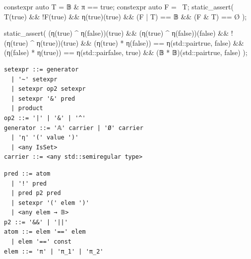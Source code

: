 \documentclass[11pt, a4paper]{article}
\begin{document}
\begin{listing}[htbp]
\caption{\textbf{Generic set algebra} corresponding to Eqn.~\ref{eqn:lattice-lift-ops} and the bottom row in Table~\ref{tab:lattice-lift}.
\textbf{Top:} worked examples on $\mathbb{B}$: a comprehension builds a singleton, complement/union/meet run the Boolean lattice (Table~\ref{tab:lattice-lift}), and membership queries the result, all on equality alone, no order on the elements.
\textbf{Bottom:} the grammar in four panels, set expressions and predicates above, the cartesian product and closed queries below.
A \texttt{setexpr} builds a set; a \texttt{pred} filters one; the cartesian \texttt{product} and the closed \texttt{query} sort are read out in the body.
The grammar is sound; \emph{decidability} is the separate, certified question, sort by sort (membership by the dominance of Equation~\ref{eqn:dominance}, \texttt{query} by the tier's normal form).
}
\label{lst:set-grammar}\label{lst:pruning}
\noindent
\begin{minipage}[t]{0.49\linewidth}
\begin{cpp}
constexpr auto T = 𝔹 & π == true;
constexpr auto F = ~T;
static_assert(
   T(true) && !F(true)
&& η(true)(true)
&& (F | T) == 𝔹
&& (F & T) == Ø{}
);
\end{cpp}
\end{minipage}\hfill
\begin{minipage}[t]{0.49\linewidth}
\begin{cpp}
static_assert(
   (η(true) ^ η(false))(true)
&& (η(true) ^ η(false))(false)
&& !(η(true) ^ η(true))(true)
&& (η(true) * η(false)) == η(std::pair{true, false})
&& (η(false) * η(true)) == η(std::pair{false, true})
&& (𝔹 * 𝔹)(std::pair{true, false})
);
\end{cpp}
\end{minipage}

\vspace{0.6em}
\noindent
\begin{minipage}[t]{0.49\linewidth}
\begin{verbatim}
setexpr ::= generator
  | '~' setexpr
  | setexpr op2 setexpr
  | setexpr '&' pred
  | product
op2 ::= '|' | '&' | '^'
generator ::= '𝔸' carrier | 'Ø' carrier
  | 'η' '(' value ')'
  | <any IsSet>
carrier ::= <any std::semiregular type>
\end{verbatim}
\end{minipage}\hfill
\begin{minipage}[t]{0.49\linewidth}
\begin{verbatim}
pred ::= atom
  | '!' pred
  | pred p2 pred
  | setexpr '(' elem ')'
  | <any elem → 𝔹>
p2 ::= '&&' | '||'
atom ::= elem '==' elem
  | elem '==' const
elem ::= 'π' | 'π_1' | 'π_2'
\end{verbatim}
\end{minipage}


\end{listing}
\end{document}
